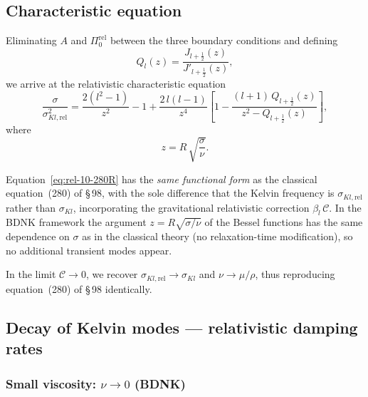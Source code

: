 \subsection{Characteristic equation}\label{sec:rel-10-98-chareq}

Eliminating $A$ and $\Pi_{0}^{\mathrm{rel}}$ between the three
boundary conditions and defining
\begin{equation}\label{eq:rel-10-270R}
  Q_{l}(z)
  = \frac{J_{l+\frac{1}{2}}(z)}
         {J'_{l+\frac{1}{2}}(z)},
\end{equation}
we arrive at the relativistic characteristic equation
\begin{equation}\label{eq:rel-10-280R}
  \boxed{
  \frac{\sigma}{\sigma_{Kl,\mathrm{rel}}^{2}}
  = \frac{2(l^{2}-1)}{z^{2}} - 1
    + \frac{2\,l(l-1)}{z^{4}}
      \left[1 - \frac{(l+1)\,Q_{l+\frac{1}{2}}(z)}
                      {z^{2}
                       - Q_{l+\frac{1}{2}}(z)}
      \right],
  }
\end{equation}
where
\begin{equation}\label{eq:rel-10-z}
  z = R\,\sqrt{\frac{\sigma}{\nu}}.
\end{equation}

Equation~\eqref{eq:rel-10-280R} has the \emph{same functional form}
as the classical equation~(280) of \S\,98, with the sole difference
that the Kelvin frequency is $\sigma_{Kl,\mathrm{rel}}$ rather
than $\sigma_{Kl}$, incorporating the gravitational relativistic
correction $\beta_{l}\,\mathcal{C}$.  In the BDNK framework the
argument $z = R\sqrt{\sigma/\nu}$ of the Bessel functions has the
same dependence on $\sigma$ as in the classical theory (no
relaxation-time modification), so no additional transient modes
appear.

In the limit $\mathcal{C}\to 0$, we recover
$\sigma_{Kl,\mathrm{rel}}\to\sigma_{Kl}$ and
$\nu \to \mu/\rho$, thus reproducing
equation~(280) of \S\,98 identically.

\subsection{Decay of Kelvin modes --- relativistic damping rates}
\label{sec:rel-10-98-decay}

\subsubsection*{Small viscosity: $\nu\to 0$ (BDNK)}


